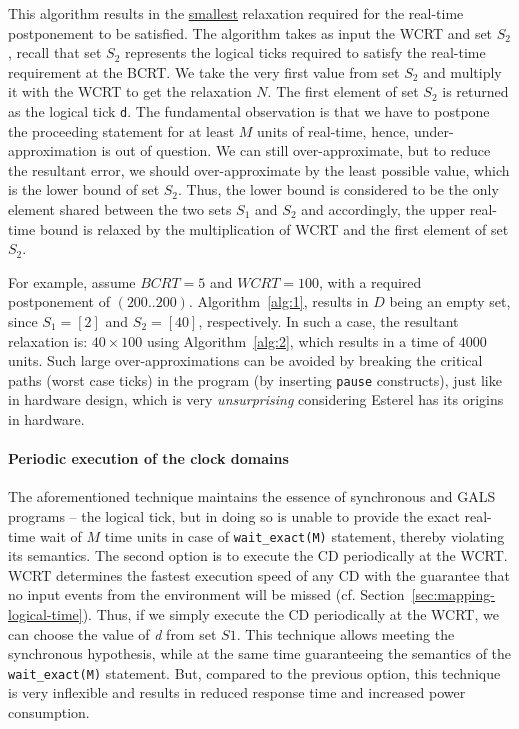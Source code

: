This algorithm results in the \underline{smallest} relaxation required
for the real-time postponement to be satisfied. The algorithm takes as
input the WCRT and set $S_2$, recall that set $S_2$ represents the
logical ticks required to satisfy the real-time requirement at the
BCRT. We take the very first value from set $S_2$ and multiply it with
the WCRT to get the relaxation $N$. The first element of set $S_2$ is
returned as the logical tick \texttt{d}. The fundamental observation is
that we have to postpone the proceeding statement for at least $M$ units
of real-time, hence, under-approximation is out of question. We can
still over-approximate, but to reduce the resultant error, we should
over-approximate by the least possible value, which is the lower bound
of set $S_2$. Thus, the lower bound is considered to be the only element
shared between the two sets $S_1$ and $S_2$ and accordingly, the upper
real-time bound is relaxed by the multiplication of WCRT and the first
element of set $S_2$.

For example, assume $BCRT=5$ and $WCRT=100$, with a required
postponement of $(200..200)$. Algorithm~\ref{alg:1}, results in $D$
being an empty set, since $S_1=[2]$ and $S_2=[40]$, respectively. In
such a case, the resultant relaxation is: $40 \times 100$ using
Algorithm~\ref{alg:2}, which results in a time of $4000$ units. Such
large over-approximations can be avoided by breaking the critical paths
(worst case ticks) in the program (by inserting \texttt{pause}
constructs), just like in hardware design, which is very
\textit{unsurprising} considering Esterel has its origins in hardware.

\paragraph{Periodic execution of the clock domains}
\label{sec:peri-exec-clock}

The aforementioned technique maintains the essence of synchronous and
GALS programs -- the logical tick, but in doing so is unable to provide
the exact real-time wait of $M$ time units in case of
\texttt{wait\_exact(M)} statement, thereby violating its
semantics. The second option is to execute the CD periodically at the
WCRT. WCRT determines the fastest execution speed of any CD with the
guarantee that no input events from the environment will be missed
(cf. Section~\ref{sec:mapping-logical-time}). Thus, if we simply execute
the CD periodically at the WCRT, we can choose the value of
\textit{d} from set $S1$. This technique allows meeting the synchronous
hypothesis, while at the same time guaranteeing the semantics of the
\texttt{wait\_exact(M)} statement. But, compared to the previous
option, this technique is very inflexible and results in reduced
response time and increased power consumption.

